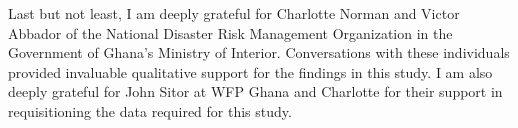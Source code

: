 \documentclass[masters]{ucbthesis}
\begin{document}
\begin{frontmatter}
\begin{acknowledgements}
Last but not least, I am deeply grateful for Charlotte Norman and Victor Abbador of the National Disaster Risk Management Organization in the Government of Ghana’s Ministry of Interior. Conversations with these individuals provided invaluable qualitative support for the findings in this study. I am also deeply grateful for John Sitor at WFP Ghana and Charlotte for their support in requisitioning the data required for this study.
\end{acknowledgements}

\end{frontmatter}

\pagestyle{headings}












\printbibliography


\end{document}
